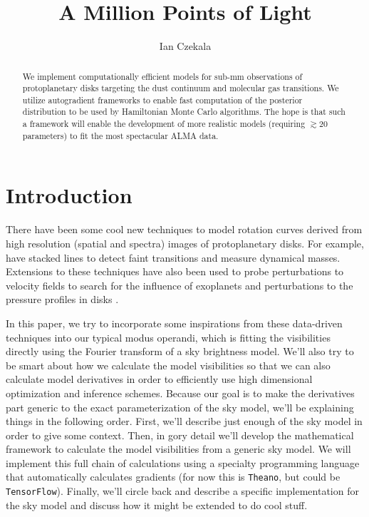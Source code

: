 \documentclass[modern]{aastex62}
\begin{document}
\title{A Million Points of Light}


\author[0000-0002-1483-8811]{Ian Czekala}


\begin{abstract}
We implement computationally efficient models for sub-mm observations of protoplanetary disks targeting the dust continuum and molecular gas transitions. We utilize autogradient frameworks to enable fast computation of the posterior distribution to be used by Hamiltonian Monte Carlo algorithms. The hope is that such a framework will enable the development of more realistic models (requiring $\gtrsim 20$ parameters) to fit the most spectacular ALMA data.
\end{abstract}


\section{Introduction} \label{sec:intro}

There have been some cool new techniques to model rotation curves derived from high resolution (spatial and spectra) images of protoplanetary disks. For example, \citet{yen16,yen18} have stacked lines to detect faint transitions and measure dynamical masses. Extensions to these techniques have also been used to probe perturbations to velocity fields to search for the influence of exoplanets \citep{teague18a} and perturbations to the pressure profiles in disks \citep{teague18c}.

In this paper, we try to incorporate some inspirations from these data-driven techniques into our typical modus operandi, which is fitting the visibilities directly using the Fourier transform of a sky brightness model. We'll also try to be smart about how we calculate the model visibilities so that we can also calculate model derivatives in order to efficiently use high dimensional optimization and inference schemes. Because our goal is to make the derivatives part generic to the exact parameterization of the sky model, we'll be explaining things in the following order. First, we'll describe just enough of the sky model in order to give some context. Then, in gory detail we'll develop the mathematical framework to calculate the model visibilities from a generic sky model. We will implement this full chain of calculations using a specialty programming language that automatically calculates gradients (for now this is \texttt{Theano}, but could be \texttt{TensorFlow}). Finally, we'll circle back and describe a specific implementation for the sky model and discuss how it might be extended to do cool stuff.
\end{document}
